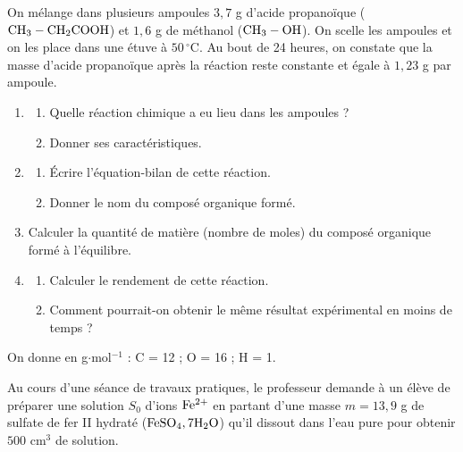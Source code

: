 \documentclass[11pt]{article}
\begin{document}


On mélange dans plusieurs ampoules $3{,}7$ g d'acide propanoïque ($\mathrm{CH_3-CH_2COOH}$) et $1{,}6$ g de méthanol ($\mathrm{CH_3-OH}$). On scelle les ampoules et on les place dans une étuve à $50\,^\circ$C. Au bout de 24 heures, on constate que la masse d'acide propanoïque après la réaction reste constante et égale à $1{,}23$ g par ampoule.

\begin{enumerate}
  \item \begin{enumerate}[label=\alph*.]
    \item Quelle réaction chimique a eu lieu dans les ampoules ?
    \item Donner ses caractéristiques.
  \end{enumerate}
  \item \begin{enumerate}[label=\alph*.]
    \item Écrire l'équation-bilan de cette réaction.
    \item Donner le nom du composé organique formé.
  \end{enumerate}
  \item Calculer la quantité de matière (nombre de moles) du composé organique formé à l'équilibre.
  \item \begin{enumerate}[label=\alph*.]
    \item Calculer le rendement de cette réaction.
    \item Comment pourrait-on obtenir le même résultat expérimental en moins de temps ?
  \end{enumerate}
\end{enumerate}
\noindent On donne en g$\cdot$mol$^{-1}$ : C = 12 ; O = 16 ; H = 1.

Au cours d'une séance de travaux pratiques, le professeur demande à un élève de préparer une solution $S_0$ d'ions $\mathrm{Fe^{2+}}$ en partant d'une masse $m = 13{,}9$ g de sulfate de fer II hydraté ($\mathrm{FeSO_4,7H_2O}$) qu'il dissout dans l'eau pure pour obtenir $500$ cm$^3$ de solution.
\end{document}

